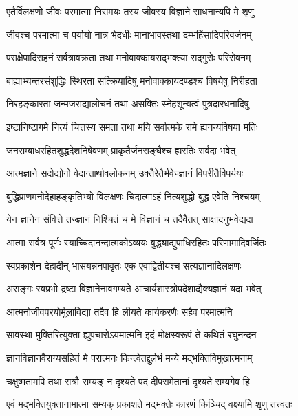 \twolineshloka
{एतैर्विलक्षणो जीवः परमात्मा निरामयः}
{तस्य जीवस्य विज्ञाने साधनान्यपि मे शृणु} %

\twolineshloka
{जीवश्च परमात्मा च पर्यायो नात्र भेदधीः}
{मानाभावस्तथा दम्भहिंसादिपरिवर्जनम्} %

\twolineshloka
{पराक्षेपादिसहनं सर्वत्रावक्रता तथा}
{मनोवाक्कायसद्भक्त्या सद्गुरोः परिसेवनम्} %

\twolineshloka
{बाह्याभ्यन्तरसंशुद्धिः स्थिरता सत्क्रियादिषु}
{मनोवाक्कायदण्डश्च विषयेषु निरीहता} %

\twolineshloka
{निरहङ्कारता जन्मजराद्यालोचनं तथा}
{असक्तिः स्नेहशून्यत्वं पुत्रदारधनादिषु} %

\twolineshloka
{इष्टानिष्टागमे नित्यं चित्तस्य समता तथा}
{मयि सर्वात्मके रामे ह्यनन्यविषया मतिः} %

\twolineshloka
{जनसम्बाधरहितशुद्धदेशनिषेवणम्}
{प्राकृतैर्जनसङ्घैश्च ह्यरतिः सर्वदा भवेत्} %

\twolineshloka
{आत्मज्ञाने सदोद्योगो वेदान्तार्थावलोकनम्}
{उक्तैरेतैर्भवेज्ज्ञानं विपरीतैर्विपर्ययः} %

\twolineshloka
{बुद्धिप्राणमनोदेहाहङ्कृतिभ्यो विलक्षणः}
{चिदात्माऽहं नित्यशुद्धो बुद्ध एवेति निश्चयम्} %

\twolineshloka
{येन ज्ञानेन संवित्ते तज्ज्ञानं निश्चितं च मे}
{विज्ञानं च तदैवैतत् साक्षादनुभवेद्यदा} %

\twolineshloka
{आत्मा सर्वत्र पूर्णः स्याच्चिदानन्दात्मकोऽव्ययः}
{बुद्ध्याद्युपाधिरहितः परिणामादिवर्जितः} %

\twolineshloka
{स्वप्रकाशेन देहादीन् भासयन्ननपावृतः}
{एक एवाद्वितीयश्च सत्यज्ञानादिलक्षणः} %

\twolineshloka
{असङ्गः स्वप्रभो द्रष्टा विज्ञानेनावगम्यते}
{आचार्यशास्त्रोपदेशाद्यैक्यज्ञानं यदा भवेत्} %

\twolineshloka
{आत्मनोर्जीवपरयोर्मूलाविद्या तदैव हि}
{लीयते कार्यकरणैः सहैव परमात्मनि} %

\twolineshloka
{सावस्था मुक्तिरित्युक्ता ह्युपचारोऽयमात्मनि}
{इदं मोक्षस्वरूपं ते कथितं रघुनन्दन} %

\twolineshloka
{ज्ञानविज्ञानवैराग्यसहितं मे परात्मनः}
{किन्त्वेतद्दुर्लभं मन्ये मद्भक्तिविमुखात्मनाम्} %

\twolineshloka
{चक्षुष्मतामपि तथा रात्रौ सम्यङ् न दृश्यते}
{पदं दीपसमेतानां दृश्यते सम्यगेव हि} %

\twolineshloka
{एवं मद्भक्तियुक्तानामात्मा सम्यक् प्रकाशते}
{मद्भक्तेः कारणं किञ्चिद् वक्ष्यामि शृणु तत्त्वतः} %

